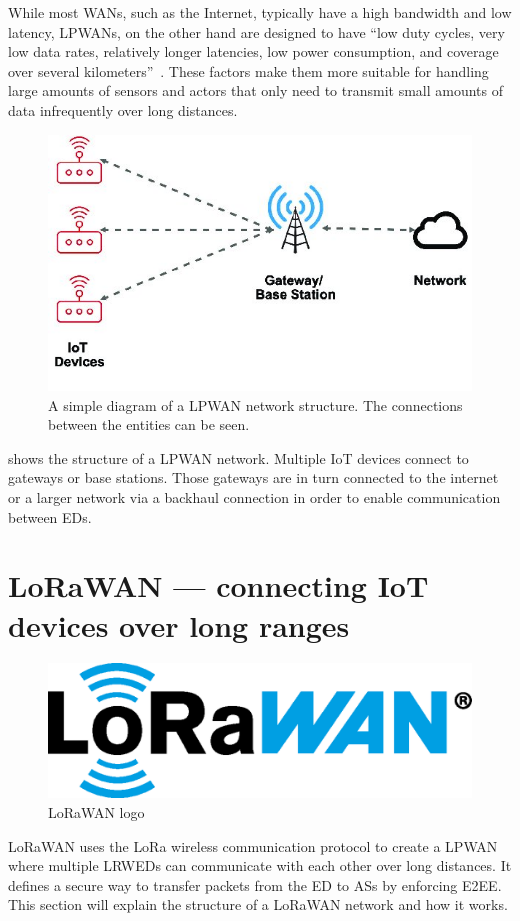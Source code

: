 While most \acp{WAN}, such as the Internet, typically have a high bandwidth and low latency, \acp{LPWAN}, on the other hand are designed to have ``low duty cycles, very low data rates, relatively longer latencies, low power consumption, and coverage over several kilometers''~\cite[p. 289]{kumar_connecting_2023}.
These factors make them more suitable for handling large amounts of sensors and actors that only need to transmit small amounts of data infrequently over long distances.

\begin{figure}[htbp]
    \centering
    \includegraphics[width=.5\textwidth]{pictures/lorawan-structure/lpwan_network_structure.jpg}
    \caption{
        A simple diagram of a \ac{LPWAN} network structure.
        The connections between the entities can be seen.\protect\cite{fernandez_assessing_2020}
    }\label{pic:lpwan-diagram}
\end{figure}

 shows the structure of a \ac{LPWAN} network.
Multiple \ac{IoT} devices connect to gateways or base stations.
Those gateways are in turn connected to the internet or a larger network via a backhaul connection in order to enable communication between \aclp{ED}.

\section{\acl{LoRaWAN} — connecting \acl{IoT} devices over long ranges}\label{sec:lorawan}

\begin{figure}[htbp]
    \centering
    \includegraphics[width=.3\textwidth]{pictures/logos/LoRaWAN_Logo.eps}
    \caption{
        \ac{LoRaWAN} logo~\protect\cite{lora_alliance_francais_2022}
    }
\end{figure}

\ac{LoRaWAN} uses the \ac{LoRa} wireless communication protocol to create a \ac{LPWAN} where multiple \aclp{LRWED} can communicate with each other over long distances.
It defines a secure way to transfer packets from the \acl{ED} to \acp{AS} by enforcing \ac{E2EE}.
This section will explain the structure of a \ac{LoRaWAN} network and how it works.

